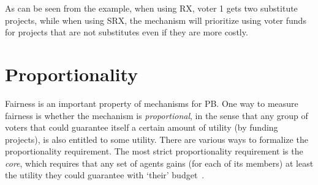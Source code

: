 \documentclass[runningheads]{llncs}
\begin{document}
\begin{example}
\begin{enumerate}
    
\end{enumerate}
\end{example}

As can be seen from the example,  when using  RX, voter 1 gets two substitute projects, while when using SRX, the mechanism will prioritize using voter funds for projects that are not substitutes  even if they are more costly.



\section{Proportionality}
\label{sec:prop}
Fairness is an important property of mechanisms for   PB. One way to measure fairness is whether the mechanism is  \emph{proportional}, in the sense that any group of voters that could guarantee   itself a certain amount of utility (by funding  projects), is also entitled to some utility.
There are various ways to formalize the proportionality requirement. The most strict proportionality requirement is the \emph{core}, which requires that any set of agents gains (for each of its members) at least the utility they could guarantee with `their' budget~\cite{fain2016core, fain2018fair}. %
\end{document}
